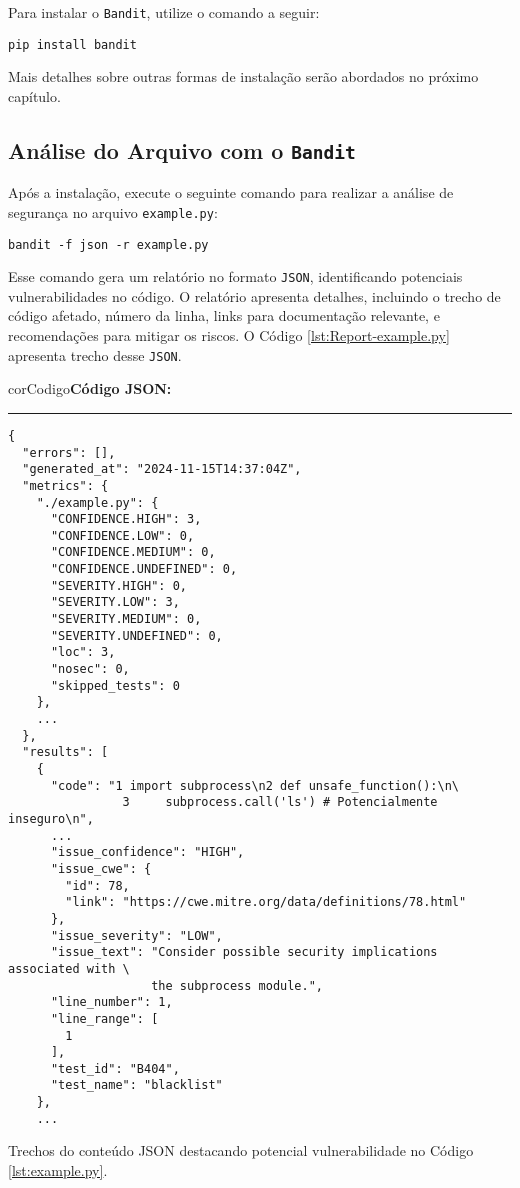 Para instalar o \texttt{Bandit}, utilize o comando a seguir:

\begin{verbatim}
pip install bandit
\end{verbatim}

Mais detalhes sobre outras formas de instalação serão abordados no próximo capítulo.

\subsection{Análise do Arquivo com o \texttt{Bandit}}

Após a instalação, execute o seguinte comando para realizar a análise de segurança no arquivo \texttt{example.py}:

\begin{verbatim}
bandit -f json -r example.py
\end{verbatim}

Esse comando gera um relatório no formato \texttt{JSON}, identificando potenciais vulnerabilidades no código. O relatório apresenta detalhes, incluindo o trecho de código afetado, número da linha, links para documentação relevante, e recomendações para mitigar os riscos. O Código \ref{lst:Report-example.py} apresenta trecho desse \texttt{JSON}.
\begin{listing}[!ht]
    \begin{myboxCode}{corCodigo}{\textbf{Código JSON: }}\vspace{3mm}
    \hrule
    \begin{verbatim}
{
  "errors": [],
  "generated_at": "2024-11-15T14:37:04Z",
  "metrics": {
    "./example.py": {
      "CONFIDENCE.HIGH": 3,
      "CONFIDENCE.LOW": 0,
      "CONFIDENCE.MEDIUM": 0,
      "CONFIDENCE.UNDEFINED": 0,
      "SEVERITY.HIGH": 0,
      "SEVERITY.LOW": 3,
      "SEVERITY.MEDIUM": 0,
      "SEVERITY.UNDEFINED": 0,
      "loc": 3,
      "nosec": 0,
      "skipped_tests": 0
    },
    ...
  },
  "results": [
    {
      "code": "1 import subprocess\n2 def unsafe_function():\n\
                3     subprocess.call('ls') # Potencialmente inseguro\n",
      ...
      "issue_confidence": "HIGH",
      "issue_cwe": {
        "id": 78,
        "link": "https://cwe.mitre.org/data/definitions/78.html"
      },
      "issue_severity": "LOW",
      "issue_text": "Consider possible security implications associated with \
                    the subprocess module.",
      "line_number": 1,
      "line_range": [
        1
      ],
      "test_id": "B404",
      "test_name": "blacklist"
    },
    ...
\end{verbatim}
\end{myboxCode}
\caption{Trechos do conteúdo JSON destacando potencial vulnerabilidade no Código \ref{lst:example.py}.}
\label{lst:Report-example.py}
\end{listing}



